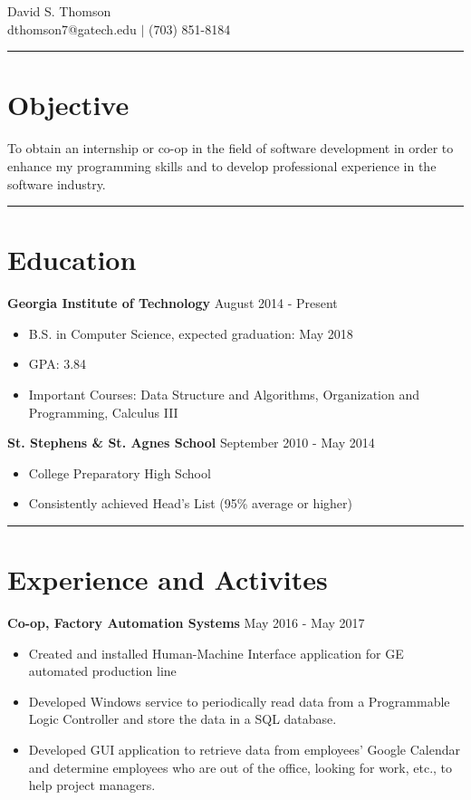 \documentclass[11pt]{article}
\begin{document}
\begin{center}
{\huge David S. Thomson} \\
\vspace*{1em}
dthomson7@gatech.edu $\vert$ (703) 851-8184
\end{center}

\rule{\textwidth}{.5pt}

\section*{Objective}
To obtain an internship or co-op in the field of software development in order to enhance my programming skills and to develop professional experience in the software industry.

\rule{\textwidth}{.5pt}

\section*{Education}
\textbf{Georgia Institute of Technology} \hfill August 2014 - Present
\begin{itemize}
\setlength\itemsep{0.5pt}
    \item B.S. in Computer Science, expected graduation: May 2018
    \item GPA: 3.84
    \item Important Courses: Data Structure and Algorithms, Organization and Programming, Calculus III %
\end{itemize}

\textbf{St. Stephens \& St. Agnes School} \hfill September 2010 - May 2014
\begin{itemize}
\setlength\itemsep{0.5pt}
    \item College Preparatory High School
    \item Consistently achieved Head's List (95\% average or higher)
\end{itemize}

\rule{\textwidth}{.5pt}

\section*{Experience and Activites}
\textbf{Co-op, Factory Automation Systems} \hfill May 2016 - May 2017
\begin{itemize}
\setlength\itemsep{0.5pt}
    \item Created and installed Human-Machine Interface application for GE automated production line
    \item Developed Windows service to periodically read data from a Programmable Logic Controller and store the data in a SQL database.
    \item Developed GUI application to retrieve data from employees' Google Calendar and determine employees who are out of the office, looking for work, etc., to help project managers.
\end{itemize}
\end{document}
